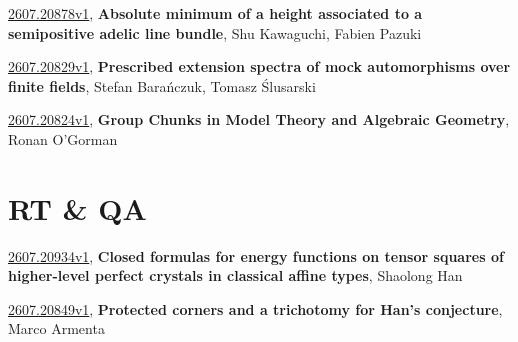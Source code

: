\documentclass[9pt, a4paper]{article}
\theoremstyle{plain}
\theoremstyle{definition}
\theoremstyle{remark}
\newcommand{\arxiv}[3]{\href{https://arxiv.org/abs/#1}{#1}, \textbf{\textcolor{arxivblue}{#2}}, #3}
\begin{document}
\arxiv{2607.20878v1}{Absolute minimum of a height associated to a semipositive adelic line bundle}{Shu Kawaguchi, Fabien Pazuki}

\arxiv{2607.20829v1}{Prescribed extension spectra of mock automorphisms over finite fields}{Stefan Barańczuk, Tomasz Ślusarski}

\arxiv{2607.20824v1}{Group Chunks in Model Theory and Algebraic Geometry}{Ronan O'Gorman}


\section{RT \& QA}
\arxiv{2607.20934v1}{Closed formulas for energy functions on tensor squares of higher-level perfect crystals in classical affine types}{Shaolong Han}

\arxiv{2607.20849v1}{Protected corners and a trichotomy for Han's conjecture}{Marco Armenta}

\end{document}
